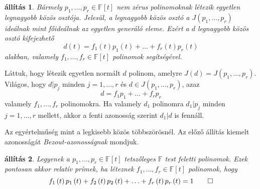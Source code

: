\documentclass[a4paper, showtrims]{memoir}
\makeatletter
\renewenvironment{proof}[1][\proofname]
    {\par\pushQED{\qed}%
    \normalfont \topsep6\p@\@plus6\p@\relax
    \trivlist
    \item[\hskip\labelsep
        \itshape
    #1\@addpunct{:}]\ignorespaces}
    {\popQED\endtrivlist\@endpefalse}
\theoremstyle{plain}
\newtheorem{proposition}{állítás}[chapter]
\theoremstyle{remark}
\theoremstyle{definition}
\makeatother
\begin{document}
\begin{proposition}
	Bármely $p_1,\ldots,p_r\in\mathbb{F}\left[ t \right]$ nem zérus polinomoknak
	létezik egyetlen legnagyobb közös osztója.
	Jelesül,
	a legnagyobb közös osztó a $J\left( p_1,\ldots,p_r \right)$ ideálnak mint főideálnak az egyetlen generáló eleme.
	Ezért a $d$ legnagyobb közös osztó kifejezhető
	\[
		d\left( t \right)=f_1\left( t \right)p_1\left( t \right)+
		\ldots+
		f_r\left( t \right)p_r\left( t \right)
	\]
	alakban,
	valamely $f_1,\ldots,f_r\in\mathbb{F}\left[ t \right]$ polinomok segítségével.
\end{proposition}
\begin{proof}
	Láttuk, hogy létezik egyetlen normált $d$ polinom, amelyre $J\left( d \right)=J\left( p_1,\ldots,p_r \right)$.
	Világos, hogy $d|p_j$ minden $j=1,\ldots,r$ és $d\in J\left( p_1,\ldots,p_r \right)$,
	azaz
	\[
		d=f_1p_1+\ldots+f_rp_r
	\]
	valamely $f_1,\ldots,f_r$ polinomokra.
	Ha valamely $d_1$ polinomra $d_1|p_j$ minden $j=1,\ldots,r$ mellett,
	akkor a fenti azonosság szerint $d_1|d$ is fennáll.

	Az egyértelműség mint a legkisebb közös többszörösnél.
\end{proof}
Az előző állítás kiemelt azonosságát \emph{Bezout-azonosságnak}
mondjuk.
\begin{proposition}
	Legyenek a $p_1,\ldots,p_r\in\mathbb{F}\left[ t \right]$ tetszőleges $\mathbb{F}$ test feletti polinomok.
	Ezek pontosan akkor relatív prímek,
	ha léteznek $f_1,\ldots,f_r\in\mathbb{F}\left[ t \right]$ polinomok, hogy
	\[
		f_1\left( t \right)p_1\left( t \right)+f_2\left( t \right)p_2\left( t \right)+\ldots+f_r\left( t \right)p_r\left( t \right)=1\qedhere
	\]
\end{proposition}
\end{document}
